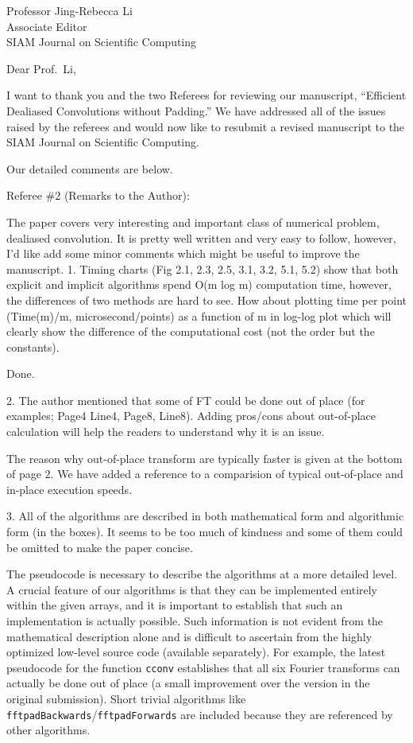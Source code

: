\documentclass[11pt]{letter}
\begin{document}
\def\bq{\par\color{red}}
\def\eq{\color{black}}

\begin{letter}
{Professor Jing-Rebecca Li\\ 
Associate Editor\\
SIAM Journal on Scientific Computing 
}
\opening{Dear Prof.\ Li,}
I want to thank you and the two Referees for reviewing our manuscript,
``Efficient Dealiased Convolutions without Padding.''
We have addressed all of the issues raised by the referees and would now
like to resubmit a revised manuscript to the SIAM Journal on Scientific
Computing.

Our detailed comments are below.

\bq
Referee \#2 (Remarks to the Author): 
 
The paper covers very interesting and important class of numerical problem, dealiased convolution. It is pretty well written and very easy to follow, however, I'd like add some minor comments which might be useful to improve the manuscript. 
1. Timing charts (Fig 2.1, 2.3, 2.5, 3.1, 3.2, 5.1, 5.2) show that both explicit and implicit algorithms spend O(m log m) computation time, however, the differences of two methods are hard to see. How about plotting time per point (Time(m)/m, microsecond/points) as a function of m in log-log plot which will clearly show the difference of the computational cost (not the order but the constants). 
\eq

Done.

\bq
2. The author mentioned that some of FT could be done out of place (for examples; Page4 Line4, Page8, Line8). Adding pros/cons about out-of-place calculation will help the readers to understand why it is an issue. 
\eq

The reason why out-of-place transform are typically faster is given at the
bottom of page 2. We have added a reference to a comparision of
typical out-of-place and in-place execution speeds.

\bq
3. All of the algorithms are described in both mathematical form and algorithmic form (in the boxes). It seems to be too much of kindness and some of them could be omitted to make the paper concise. 
\eq

The pseudocode is necessary to describe the algorithms at a more detailed level.
A crucial feature of our algorithms is that they can be implemented
entirely within the given arrays, and it is important to establish that
such an implementation is actually possible. Such information is not
evident from the mathematical description alone and is difficult to ascertain
from the highly optimized low-level source code (available separately). 
For example, the latest pseudocode for the function {\tt cconv} establishes
that all six Fourier transforms can actually be done out of place (a small
improvement over the version in the original submission). Short trivial
algorithms like {\tt fftpadBackwards}/{\tt fftpadForwards} are included
because they are referenced by other algorithms.


\end{letter}
\end{document}
